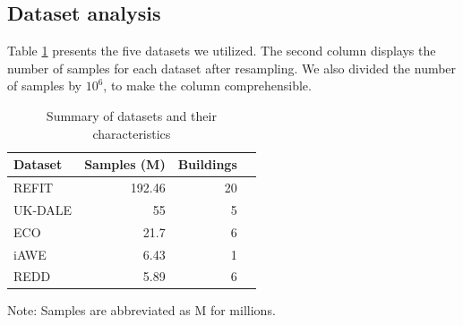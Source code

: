 \subsection{Dataset analysis}
Table \ref{tab:dataset_analysis} presents the five datasets we utilized.
The second column displays the number of samples for each dataset after resampling.
We also divided the number of samples by $10^6$, to make the column comprehensible.


\begin{table}[H]
    \caption{Summary of datasets and their characteristics}
    \centering
    \begin{tabular}{lrrr}
        \toprule
        \textbf{Dataset} & \textbf{Samples (M)} & \textbf{Buildings} \\
        \midrule
        REFIT   &   192.46 & 20 \\
        UK-DALE &   55     &  5 \\
        ECO     &   21.7   &  6 \\
        iAWE    &   6.43   &  1 \\
        REDD    &   5.89   &  6 \\
        \bottomrule
    \end{tabular}
    \label{tab:dataset_analysis}
    \par\footnotesize{Note: Samples are abbreviated as M for millions.}
\end{table}

